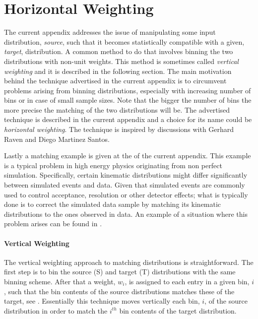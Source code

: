 
\chapter{Horizontal Weighting}
\label{AppendixB}

The current appendix addresses the issue of manipulating some input distribution, {\it source}, such that
it becomes statistically compatible with a given, {\it target}, distribution. A common method to do that
involves binning the two distributions with non-unit weights. This method is sometimes called {\it vertical weighting}
and it is described in the following section. The main motivation behind the technique advertised in the current
appendix is to circumvent problems arising from binning distributions, especially with increasing number of
bins or in case of small sample sizes. Note that the bigger the number of bins the more precise the matching
of the two distributions will be. The advertised technique is described in the current appendix and a choice for its name could be {\it horizontal weighting}.
The technique is inspired by discussions with Gerhard Raven and Diego Martinez Santos.

Lastly a matching example is given at the of the current appendix. This example is a typical problem
in high energy physics originating from non perfect simulation. Specifically, certain kinematic
distributions might differ significantly between simulated events and data. Given that simulated
events are commonly used to control acceptance, resolution or other detector effects; what is typically
done is to correct the simulated data sample by matching its kinematic distributions to the ones observed in data.
An example of a situation where this problem arises can be found in .

\subsubsection{Vertical Weighting}
The vertical weighting approach to matching distributions is straightforward.
The first step is to bin the source (S) and target (T) distributions with the same binning scheme.
After that a weight, $w_i$, is assigned to each entry in a given bin, $i$, such that the bin
contents of the source distributions matches these of the target, see .
Essentially this technique moves vertically each bin, $i$, of the source distribution in order to match
the $i^{th}$ bin contents of the target distribution.

